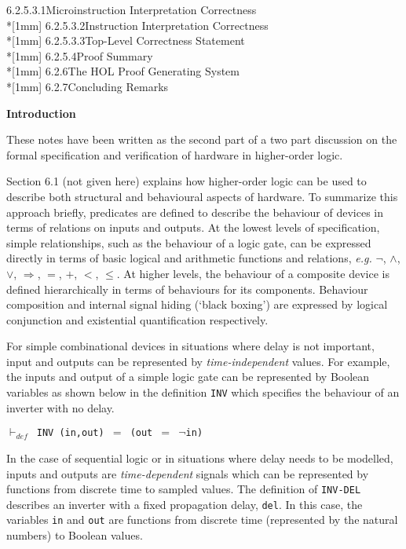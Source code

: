 \begin{normalsize}
6.2.5.3.1{\hspace*{4mm}}Microinstruction Interpretation Correctness\\*[1mm]
6.2.5.3.2{\hspace*{4mm}}Instruction Interpretation Correctness\\*[1mm]
6.2.5.3.3{\hspace*{4mm}}Top-Level Correctness Statement\\*[1mm]
6.2.5.4{\hspace*{4mm}}Proof Summary\\*[1mm]
6.2.6{\hspace*{4mm}}The HOL Proof Generating System\\*[1mm]
6.2.7{\hspace*{4mm}}Concluding Remarks

\newpage

{\large\bf Introduction}

These notes have been written as the second part of a two part
discussion on the formal specification and verification of hardware
in higher-order logic.

Section 6.1 (not given here) explains
how higher-order logic can be used to describe both structural and
behavioural aspects of hardware.
To summarize this approach  briefly,
predicates are defined to describe the behaviour of
devices in terms of relations on inputs and outputs.
At the lowest levels of specification,
simple relationships, such as the behaviour of a logic gate,
can be expressed directly in terms of basic logical
and arithmetic functions and relations,
{\it e.g.} $\neg$, $\wedge$, $\vee$, $\Longrightarrow$, $=$, $+$, $<$, $\leq$.
At higher levels, the behaviour of a composite device is defined
hierarchically in terms of behaviours for its components.
Behaviour composition and internal signal hiding (`black boxing')
are expressed by logical conjunction and existential quantification
respectively.

For simple combinational devices in situations where delay is not
important, input and outputs can be represented by {\it time-independent}
values.
For example, the inputs and output of a simple logic gate can be represented
by Boolean variables as shown below in the definition \verb"INV" which
specifies the behaviour of an inverter with no delay.

$\vdash_{def}$\verb" INV (in,out) "$=$\verb" (out "$=$\verb" "$\neg$\verb"in)"

In the case of sequential logic or in situations where delay needs to
be modelled, inputs and outputs
are {\it time-dependent} signals which can be represented by functions from
discrete time to sampled values.  The definition of
\verb"INV-DEL" describes an inverter with a fixed propagation delay,
\verb"del".  In this case, the variables \verb"in" and \verb"out" are
functions from discrete time (represented by the natural numbers)
to Boolean values.


\end{normalsize}
